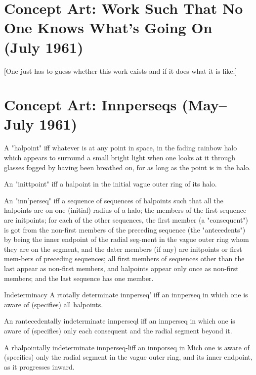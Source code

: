 \section[Concept Art: Work Such That No One Knows What's Going On (July 1961)][Concept Art: Work Such That No One Knows What's Going On]{Concept Art: Work Such That No One Knows What's Going On (July 1961)}

[One just has to guess whether this work exists and if it does what it is like.]

\clearpage
\section[Concept Art: Innperseqs (May--July 1961)][Concept Art: Innperseqs]{Concept Art: Innperseqs (May--July 1961)}

A "halpoint" iff whatever is at any point in space, in the fading rainbow halo which appears to surround a small bright light when one looks at it through glasses fogged by having been breathed on, for as long as the point is in the halo. 

An "inittpoint" iff a halpoint in the initial vague outer ring of its halo.

An "inn'perseq" iff a sequence of sequences of halpoints such that all the halpoints are on one (initial) radius of a halo; the members of the first sequence are initpoints; for each of the other sequences, the first member (a "consequent") is got from the non-first members of the preceding sequence (the "anteeedents") by being the inner endpoint of the radial seg-ment in the vague outer ring whom they are on the segment, and the dater members (if any) are initpoints or first mem-bers of preceding sequences; all first members of sequences other than the last appear as non-first members, and halpoints appear only once as non-first members; and the last sequence has one member. 

Indeterminacy A rtotally determinate innperseq' iff an innperseq in which one is aware of (specifies) all halpoints. 

An rantecedentally indeterminate innperseql iff an innperseq in which one is aware of (specifies) only each consequent and the radial segment beyond it. 

A rhalpointally indeterminate innperseq-liff an innporseq in Mich one is aware of (specifies) only the radial segment in the vague outer ring, and its inner endpoint, as it progresses inward. 


